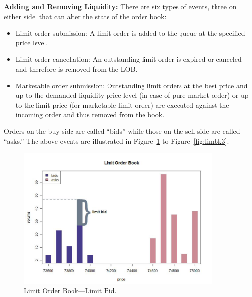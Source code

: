\noindent\textbf{Adding and Removing Liquidity:} There are six types of events, three on either side, that can alter the state of the order book:
	\begin{itemize}
	\item Limit order submission: A limit order is added to the queue at the specified price level.
	\item Limit order cancellation: An outstanding limit order is expired or canceled and therefore is removed from the LOB.
	\item Marketable order submission: Outstanding limit orders at the best price and up to the demanded liquidity price level (in case of pure market order) or up to the limit price (for marketable limit order) are executed against the incoming order and thus removed from the book.
	\end{itemize}


Orders on the buy side are called ``bids'' while those on the sell side are called ``asks.'' The above events are illustrated in Figure~\ref{fig:limbk1} to Figure~\ref{fig:limbk3}. \\
	\begin{figure}[!ht]
	   \centering
	   \includegraphics[width=0.9\textwidth]{chapters/chapter_trading_fund/figures/limitbk1.png} 
	   \caption{Limit Order Book---Limit Bid. \label{fig:limbk1}}
	\end{figure}
	

